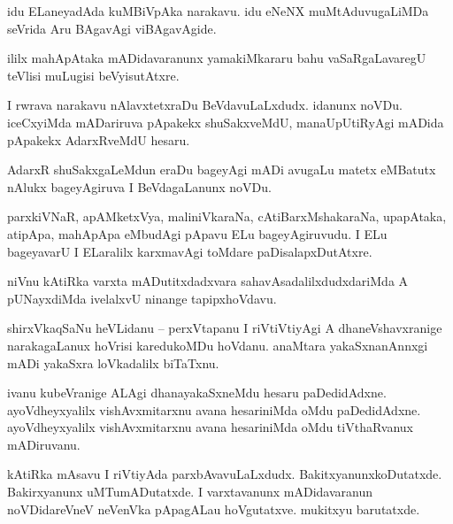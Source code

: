 \documentclass{article}
\begin{document}
\begin{mn}%
idu ELaneyadAda kuMBiVpAka narakavu. idu eNeNX muMtAduvugaLiMDa seVrida Aru BAgavAgi viBAgavAgide.
\end{mn}

\begin{mn}%
ililx mahApAtaka mADidavaranunx yamakiMkararu bahu vaSaRgaLavaregU teVlisi muLugisi beVyisutAtxre.
\end{mn}

\begin{mn}%
I rwrava narakavu nAlavxtetxraDu BeVdavuLaLxdudx. idanunx noVDu. iceCxyiMda mADariruva pApakekx 
shuSakxveMdU, manaUpUtiRyAgi mADida pApakekx AdarxRveMdU hesaru.
\end{mn}

\begin{mn}%
AdarxR shuSakxgaLeMdun eraDu bageyAgi mADi avugaLu matetx eMBatutx nAlukx bageyAgiruva I 
BeVdagaLanunx noVDu.
\end{mn}

\begin{mn}%
parxkiVNaR, apAMketxVya, maliniVkaraNa, cAtiBarxMshakaraNa, upapAtaka, atipApa, mahApApa eMbudAgi 
pApavu ELu bageyAgiruvudu. I ELu bageyavarU I ELaralilx karxmavAgi toMdare paDisalapxDutAtxre.
\end{mn}

\begin{mn}%
niVnu kAtiRka varxta mADutitxdadxvara sahavAsadalilxdudxdariMda A pUNayxdiMda ivelalxvU ninange 
tapipxhoVdavu.
\end{mn}

\begin{mn}%
shirxVkaqSaNu heVLidanu -- perxVtapanu I riVtiVtiyAgi A dhaneVshavxranige narakagaLanux hoVrisi 
karedukoMDu hoVdanu. anaMtara yakaSxnanAnnxgi mADi yakaSxra loVkadalilx biTaTxnu.
\end{mn}

\begin{mn}%
ivanu kubeVranige ALAgi dhanayakaSxneMdu hesaru paDedidAdxne. ayoVdheyxyalilx vishAvxmitarxnu 
avana hesariniMda oMdu paDedidAdxne. ayoVdheyxyalilx  vishAvxmitarxnu avana hesariniMda oMdu 
tiVthaRvanux mADiruvanu.
\end{mn}

\begin{mn}%
kAtiRka mAsavu I riVtiyAda parxbAvavuLaLxdudx. BakitxyanunxkoDutatxde. Bakirxyanunx 
uMTumADutatxde. I varxtavanunx mADidavaranun noVDidareVneV neVenVka pApagALau hoVgutatxve. 
mukitxyu barutatxde.
\end{mn}
\end{document}
